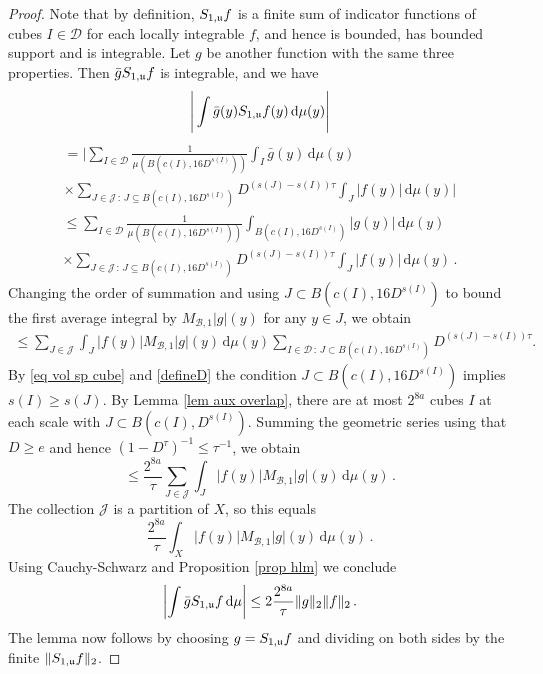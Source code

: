 \begin{proof}
    Note that by definition, $S_{1,\mathfrak u}f$ is a finite sum of indicator functions of cubes $I \in \mathcal{D}$ for each locally integrable $f$, and hence is bounded, has bounded support and is integrable. Let $g$ be another function with the same three properties. Then $\bar g S_{1,\mathfrak u}f$ is integrable, and we have
    $$
        \Bigg|\int \bar g(y) S_{1,\mathfrak u}f(y) \, \mathrm{d}\mu(y)\Bigg|
    $$
    \begin{multline*}
        = \Bigg|\sum_{I\in\mathcal{D}} \frac{1}{\mu(B(c(I), 16 D^{s(I)}))} \int_I \bar g(y) \, \mathrm{d}\mu(y)\\
        \times \sum_{J\in \mathcal{J}\,:\,J\subseteq B(c(I), 16 D^{s(I)})} D^{(s(J)-s(I))\tau}\int_J |f(y)| \,\mathrm{d}\mu(y)\Bigg|
    \end{multline*}
    \begin{multline*}
        \le \sum_{I\in\mathcal{D}} \frac{1}{\mu(B(c(I), 16D^{s(I)}))} \int_{B(c(I), 16D^{s(I)})} | g(y)| \, \mathrm{d}\mu(y)\\ \times \sum_{J\in \mathcal{J}\,:\,J\subseteq B(c(I), 16 D^{s(I)})} D^{(s(J)-s(I))\tau}\int_J |f(y)| \,\mathrm{d}\mu(y)\,.
    \end{multline*}
    Changing the order of summation and using $J \subset B(c(I), 16 D^{s(I)})$ to bound the first average integral by $M_{\mathcal{B},1}|g|(y)$ for any $y \in J$, we obtain
    \begin{align*}
        \le \sum_{J\in\mathcal{J}}\int_J|f(y)|  M_{\mathcal{B},1}|g|(y) \, \mathrm{d}\mu(y) \sum_{I \in \mathcal{D} \, : \, J\subset B(c(I),16 D^{s(I)})} D^{(s(J)-s(I))\tau}.
    \end{align*}
    By \eqref{eq vol sp cube} and \eqref{defineD} the condition $J \subset B(c(I), 16 D^{s(I)})$ implies $s(I) \ge s(J)$. By Lemma \ref{lem aux overlap}, there are at most $2^{8a}$ cubes $I$ at each scale with $J \subset B(c(I), D^{s(I)})$. Summing the geometric series using that $D \ge e$ and hence $(1 - D^\tau)^{-1} \le \tau^{-1}$, we obtain
    $$
        \le \frac{2^{8a}}{\tau} \sum_{J\in\mathcal{J}}\int_J|f(y)|  M_{\mathcal{B},1}|g|(y) \, \mathrm{d}\mu(y)\,.
    $$
    The collection $\mathcal{J}$ is a partition of $X$, so this equals
    $$
        \frac{2^{8a}}{\tau} \int_X|f(y)|  M_{\mathcal{B},1}|g|(y) \, \mathrm{d}\mu(y)\,.
    $$
    Using Cauchy-Schwarz and Proposition \ref{prop hlm} we conclude
    $$
        \left|\int \bar g S_{1,\mathfrak u}f \, \mathrm{d}\mu \right| \le  2\frac{2^{8a}}{\tau} \|g\|_2\|f\|_2\,.
    $$
    The lemma now follows by choosing $g = S_{1,\mathfrak u}f$ and dividing on both sides by the finite $\|S_{1,\mathfrak u}f\|_2$.
\end{proof}


